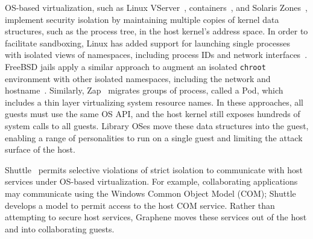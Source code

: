 OS-based virtualization, such as 
Linux VServer~\citep{vserver},  containers~\citep{bhattiprolu08containers},
and Solaris Zones~\citep{price04zones},
implement security isolation by maintaining multiple copies of kernel data structures,
such as the process tree,
in the host kernel's address space.
In order to facilitate sandboxing, 
Linux has added support for launching single processes
with isolated views of namespaces, including process IDs and network interfaces~\citep{lwn-namespaces}.
FreeBSD jails apply a similar approach to augment an isolated {\tt chroot} environment
with other isolated namespaces, including the network and hostname~\citep{jails}.
Similarly, Zap~\citep{osman02zap} migrates groups of process, called a Pod,
which includes a thin layer virtualizing system resource names.
In these approaches, all guests must use the same OS API, and the host kernel
still exposes hundreds of system calls to all guests.
Library OSes move these data structures into the guest, enabling
a range of personalities to run on a single guest and limiting the attack surface
of the host.


Shuttle~\citep{shan12shuttle} permits selective violations of strict isolation
to communicate with host services 
under OS-based virtualization.
For example, collaborating applications may communicate using the Windows Common Object Model (COM);
Shuttle develops a model to permit access to the host COM service.
Rather than attempting to secure host services,
Graphene moves these services out of the host
and into collaborating guests.


